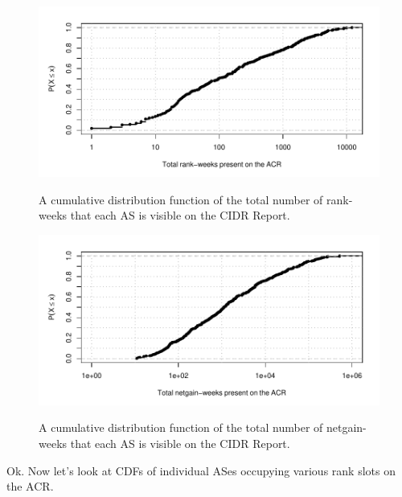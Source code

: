 \begin{figure}[H]
\begin{centering}
    \includegraphics[width=6in]{figures/acr_cdf_rankweeks.pdf}
    \vspace{-2em}\\
    \caption{A cumulative distribution function of the total number of rank-weeks that each AS is visible on the CIDR Report.}
\end{centering}
\end{figure}

\begin{figure}[H]
\begin{centering}
    \includegraphics[width=6in]{figures/acr_cdf_ngweeks.pdf}
    \vspace{-2em}\\
    \caption{A cumulative distribution function of the total number of netgain-weeks that each AS is visible on the CIDR Report.}
\end{centering}
\end{figure}

Ok. Now let's look at CDFs of individual ASes occupying various rank slots on the ACR.

